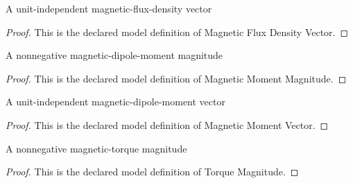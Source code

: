 \begin{definition}
  \label{def:physics:phyx-mini-0967:phyxminiproblems-problemphyxmini0967-magneticfluxdensityvector}
  A unit-independent magnetic-flux-density vector
\end{definition}
\begin{proof}
  This is the declared model definition of Magnetic Flux Density Vector.
\end{proof}
\begin{definition}
  \label{def:physics:phyx-mini-0967:phyxminiproblems-problemphyxmini0967-magneticmomentmagnitude}
  A nonnegative magnetic-dipole-moment magnitude
\end{definition}
\begin{proof}
  This is the declared model definition of Magnetic Moment Magnitude.
\end{proof}
\begin{definition}
  \label{def:physics:phyx-mini-0967:phyxminiproblems-problemphyxmini0967-magneticmomentvector}
  A unit-independent magnetic-dipole-moment vector
\end{definition}
\begin{proof}
  This is the declared model definition of Magnetic Moment Vector.
\end{proof}
\begin{definition}
  \label{def:physics:phyx-mini-0967:phyxminiproblems-problemphyxmini0967-torquemagnitude}
  A nonnegative magnetic-torque magnitude
\end{definition}
\begin{proof}
  This is the declared model definition of Torque Magnitude.
\end{proof}
